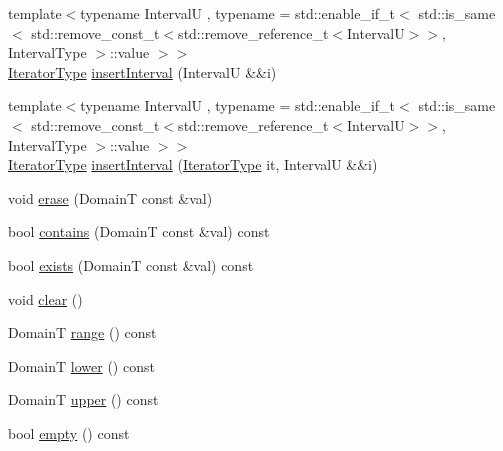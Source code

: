 \begin{DoxyCompactItemize}
\item 
{\footnotesize template$<$typename IntervalU , typename  = std\+::enable\+\_\+if\+\_\+t$<$      std\+::is\+\_\+same$<$        std\+::remove\+\_\+const\+\_\+t$<$std\+::remove\+\_\+reference\+\_\+t$<$\+Interval\+U$>$$>$, Interval\+Type      $>$\+::value    $>$$>$ }\\\hyperlink{structvt_1_1term_1_1interval_1_1_integral_set_base_a111b2ec1ea960a40ba4270be702f11f1}{Iterator\+Type} \hyperlink{structvt_1_1term_1_1interval_1_1_integral_set_base_ade802dbc86e759545ee5b3aaa9bf6396}{insert\+Interval} (IntervalU \&\&i)
\item 
{\footnotesize template$<$typename IntervalU , typename  = std\+::enable\+\_\+if\+\_\+t$<$      std\+::is\+\_\+same$<$        std\+::remove\+\_\+const\+\_\+t$<$std\+::remove\+\_\+reference\+\_\+t$<$\+Interval\+U$>$$>$, Interval\+Type      $>$\+::value    $>$$>$ }\\\hyperlink{structvt_1_1term_1_1interval_1_1_integral_set_base_a111b2ec1ea960a40ba4270be702f11f1}{Iterator\+Type} \hyperlink{structvt_1_1term_1_1interval_1_1_integral_set_base_a2520319a367538b984b3a3a1ba56204d}{insert\+Interval} (\hyperlink{structvt_1_1term_1_1interval_1_1_integral_set_base_a111b2ec1ea960a40ba4270be702f11f1}{Iterator\+Type} it, IntervalU \&\&i)
\item 
void \hyperlink{structvt_1_1term_1_1interval_1_1_integral_set_base_a26d04c73487d5911c447e627dae87627}{erase} (DomainT const \&val)
\item 
bool \hyperlink{structvt_1_1term_1_1interval_1_1_integral_set_base_aa44021f10057190693c22777749fc8c4}{contains} (DomainT const \&val) const
\item 
bool \hyperlink{structvt_1_1term_1_1interval_1_1_integral_set_base_a4f5f1203eb50e1ebaccc479b16af89a1}{exists} (DomainT const \&val) const
\item 
void \hyperlink{structvt_1_1term_1_1interval_1_1_integral_set_base_a5786bb488ef808cd89474afa94ecc856}{clear} ()
\item 
DomainT \hyperlink{structvt_1_1term_1_1interval_1_1_integral_set_base_a9c808e539cad61d40a062317e983ba74}{range} () const
\item 
DomainT \hyperlink{structvt_1_1term_1_1interval_1_1_integral_set_base_a5d0984e302e0ddb9828130261b86ec50}{lower} () const
\item 
DomainT \hyperlink{structvt_1_1term_1_1interval_1_1_integral_set_base_a88ef66995c9fd0c1d8ba031dab28da9b}{upper} () const
\item 
bool \hyperlink{structvt_1_1term_1_1interval_1_1_integral_set_base_aaf1b42550ad04b45edf7bb0b120a3ea5}{empty} () const

\end{DoxyCompactItemize}
